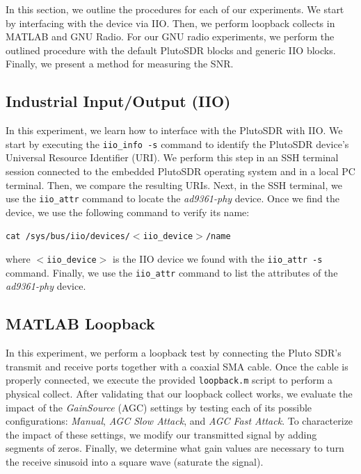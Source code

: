 \documentclass{article}
\begin{document}
In this section, we outline the procedures for each of our experiments. We start by interfacing with the device via IIO. Then, we perform loopback collects in MATLAB and GNU Radio. For our GNU radio experiments, we perform the outlined procedure with the default PlutoSDR blocks and generic IIO blocks. Finally, we present a method for measuring the SNR.

\subsection{Industrial Input/Output (IIO)}
\label{section::industrial_input_output}

In this experiment, we learn how to interface with the PlutoSDR with IIO. We start by executing the \texttt{iio\_info -s} command to identify the PlutoSDR device's Universal Resource Identifier (URI). We perform this step in an SSH terminal session connected to the embedded PlutoSDR operating system and in a local PC terminal. Then, we compare the resulting URIs. Next, in the SSH terminal, we use the \texttt{iio\_attr} command to locate the \textit{ad9361-phy} device. Once we find the device, we use the following command to verify its name:

\begin{center}
\texttt{cat /sys/bus/iio/devices/$<$iio\_device$>$/name}
\end{center}

where \texttt{$<$iio\_device$>$} is the IIO device we found with the \texttt{iio\_attr -s} command. Finally, we use the \texttt{iio\_attr} command to list the attributes of the \textit{ad9361-phy} device.

\subsection{MATLAB Loopback}

In this experiment, we perform a loopback test by connecting the Pluto SDR's transmit and receive ports together with a coaxial SMA cable. Once the cable is properly connected, we execute the provided \texttt{loopback.m} script to perform a physical collect. After validating that our loopback collect works, we evaluate the impact of the \textit{GainSource} (AGC) settings by testing each of its possible configurations: \textit{Manual}, \textit{AGC Slow Attack}, and \textit{AGC Fast Attack}. To characterize the impact of these settings, we modify our transmitted signal by adding segments of zeros. Finally, we determine what gain values are necessary to turn the receive sinusoid into a square wave (saturate the signal).
\end{document}
